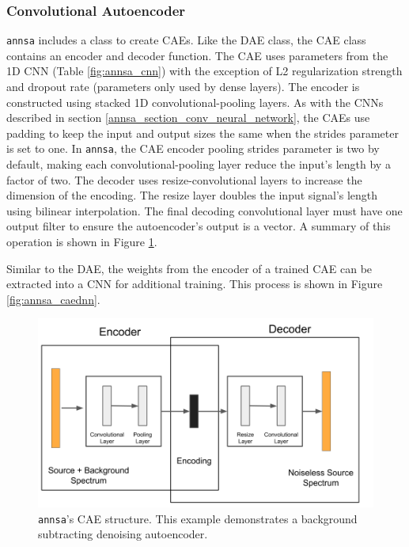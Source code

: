 \subsubsection{Convolutional Autoencoder}

\verb|annsa| includes a class to create CAEs. Like the DAE class, the CAE class contains an encoder and decoder function. The CAE uses parameters from the 1D CNN (Table \ref{fig:annsa_cnn}) with the exception of L2 regularization strength and dropout rate (parameters only used by dense layers). The encoder is constructed using stacked 1D convolutional-pooling layers. As with the CNNs described in section \ref{annsa_section_conv_neural_network}, the CAEs use padding to keep the input and output sizes the same when the strides parameter is set to one. In \verb|annsa|, the CAE encoder pooling strides parameter is two by default, making each convolutional-pooling layer reduce the input's length by a factor of two. The decoder uses resize-convolutional layers to increase the dimension of the encoding. The resize layer doubles the input signal's length using bilinear interpolation. The final decoding convolutional layer must have one output filter to ensure the autoencoder's output is a vector. A summary of this operation is shown in Figure \ref{fig:annsa_cae}.

Similar to the DAE, the weights from the encoder of a trained CAE can be extracted into a CNN for additional training. This process is shown in Figure \ref{fig:annsa_caednn}.

\begin{figure}[H]
\centering
\includegraphics[trim=0 0 30 0,clip,width=1.0\linewidth]{images/annsa_cae.png}
\caption{\texttt{annsa}'s CAE structure. This example demonstrates a background subtracting denoising autoencoder.}
\label{fig:annsa_cae}
\end{figure}

